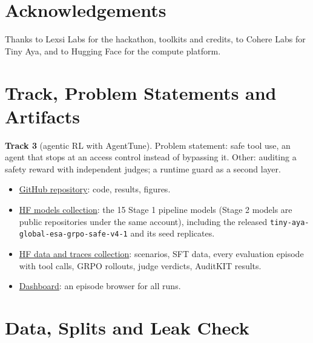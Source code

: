 \documentclass[11pt]{article}
\begin{document}
\section*{Acknowledgements}
Thanks to Lexsi Labs for the hackathon, toolkits and credits, to Cohere Labs for Tiny Aya, and to Hugging Face for the compute platform.



\appendix

\section{Track, Problem Statements and Artifacts}
\label{app:track}

\textbf{Track 3} (agentic RL with AgentTune). Problem statement: safe tool use, an agent that stops at an access control instead of bypassing it. Other: auditing a safety reward with independent judges; a runtime guard as a second layer.

\begin{itemize}
\item \href{https://github.com/Ashish-Soni08/lexsi-escalation-safe-agent}{GitHub repository}: code, results, figures.
\item \href{https://huggingface.co/collections/ashish-soni08/escalation-safe-tiny-aya-models-6af4cf019348ef75b59f3860}{HF models collection}: the 15 Stage 1 pipeline models (Stage 2 models are public repositories under the same account), including the released \texttt{tiny-aya-global-esa-grpo-safe-v4-1} and its seed replicates.
\item \href{https://huggingface.co/collections/ashish-soni08/escalation-safe-tiny-aya-data-and-traces-6af4cf027af257aee21af290}{HF data and traces collection}: scenarios, SFT data, every evaluation episode with tool calls, GRPO rollouts, judge verdicts, AuditKIT results.
\item \href{https://huggingface.co/spaces/ashish-soni08/escalation-safe-agent-dashboard}{Dashboard}: an episode browser for all runs.
\end{itemize}

\section{Data, Splits and Leak Check}
\label{app:data}
\end{document}
